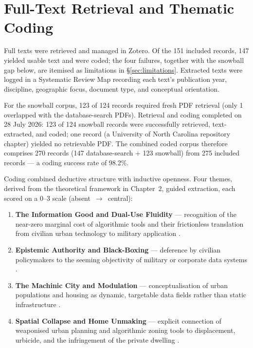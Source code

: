 \section{Full-Text Retrieval and Thematic Coding}
\label{sec:extraction}

Full texts were retrieved and managed in Zotero. Of the 151 included records, 147 yielded usable text and were coded; the four failures, together with the snowball gap below, are itemised as limitations in §\ref{sec:limitations}. Extracted texts were logged in a Systematic Review Map recording each text's publication year, discipline, geographic focus, document type, and conceptual orientation.

For the snowball corpus, 123 of 124 records required fresh PDF retrieval (only 1 overlapped with the database-search PDFs). Retrieval and coding completed on 28 July 2026: 123 of 124 snowball records were successfully retrieved, text-extracted, and coded; one record (a University of North Carolina repository chapter) yielded no retrievable PDF. The combined coded corpus therefore comprises 270 records (147 database-search + 123 snowball) from 275 included records — a coding success rate of 98.2\%.

Coding combined deductive structure with inductive openness. Four themes, derived from the theoretical framework in Chapter~2, guided extraction, each scored on a 0–3 scale (absent~$\rightarrow$~central):

\begin{enumerate}
\item \textbf{The Information Good and Dual-Use Fluidity} — recognition of the near-zero marginal cost of algorithmic tools and their frictionless translation from civilian urban technology to military application \parencite{arrow1962}.
\item \textbf{Epistemic Authority and Black-Boxing} — deference by civilian policymakers to the seeming objectivity of military or corporate data systems \parencite{michael2007,pasquale2015}.
\item \textbf{The Machinic City and Modulation} — conceptualisation of urban populations and housing as dynamic, targetable data fields rather than static infrastructure \parencite{deleuze1990,delanda1992,delanda2014}.
\item \textbf{Spatial Collapse and Home Unmaking} — explicit connection of weaponised urban planning and algorithmic zoning tools to displacement, urbicide, and the infringement of the private dwelling \parencite{king2004,graham2004,graham2011,weizman2007}.
\end{enumerate}

